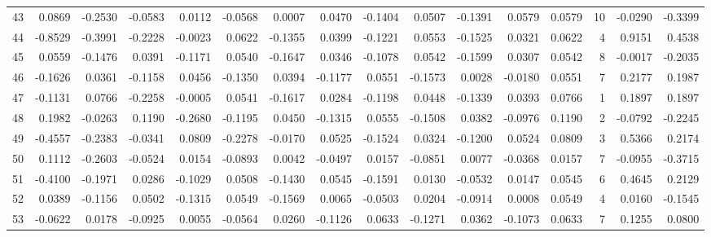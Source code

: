 \begin{tabular}{lrrrrrrrrrrrrrrr}
43  &      0.0869 & -0.2530 & -0.0583 &  0.0112 & -0.0568 &  0.0007 &  0.0470 & -0.1404 &  0.0507 & -0.1391 &   0.0579 &     0.0579 &     10 &                   -0.0290 &                    -0.3399 \\
44  &     -0.8529 & -0.3991 & -0.2228 & -0.0023 &  0.0622 & -0.1355 &  0.0399 & -0.1221 &  0.0553 & -0.1525 &   0.0321 &     0.0622 &      4 &                    0.9151 &                     0.4538 \\
45  &      0.0559 & -0.1476 &  0.0391 & -0.1171 &  0.0540 & -0.1647 &  0.0346 & -0.1078 &  0.0542 & -0.1599 &   0.0307 &     0.0542 &      8 &                   -0.0017 &                    -0.2035 \\
46  &     -0.1626 &  0.0361 & -0.1158 &  0.0456 & -0.1350 &  0.0394 & -0.1177 &  0.0551 & -0.1573 &  0.0028 &  -0.0180 &     0.0551 &      7 &                    0.2177 &                     0.1987 \\
47  &     -0.1131 &  0.0766 & -0.2258 & -0.0005 &  0.0541 & -0.1617 &  0.0284 & -0.1198 &  0.0448 & -0.1339 &   0.0393 &     0.0766 &      1 &                    0.1897 &                     0.1897 \\
48  &      0.1982 & -0.0263 &  0.1190 & -0.2680 & -0.1195 &  0.0450 & -0.1315 &  0.0555 & -0.1508 &  0.0382 &  -0.0976 &     0.1190 &      2 &                   -0.0792 &                    -0.2245 \\
49  &     -0.4557 & -0.2383 & -0.0341 &  0.0809 & -0.2278 & -0.0170 &  0.0525 & -0.1524 &  0.0324 & -0.1200 &   0.0524 &     0.0809 &      3 &                    0.5366 &                     0.2174 \\
50  &      0.1112 & -0.2603 & -0.0524 &  0.0154 & -0.0893 &  0.0042 & -0.0497 &  0.0157 & -0.0851 &  0.0077 &  -0.0368 &     0.0157 &      7 &                   -0.0955 &                    -0.3715 \\
51  &     -0.4100 & -0.1971 &  0.0286 & -0.1029 &  0.0508 & -0.1430 &  0.0545 & -0.1591 &  0.0130 & -0.0532 &   0.0147 &     0.0545 &      6 &                    0.4645 &                     0.2129 \\
52  &      0.0389 & -0.1156 &  0.0502 & -0.1315 &  0.0549 & -0.1569 &  0.0065 & -0.0503 &  0.0204 & -0.0914 &   0.0008 &     0.0549 &      4 &                    0.0160 &                    -0.1545 \\
53  &     -0.0622 &  0.0178 & -0.0925 &  0.0055 & -0.0564 &  0.0260 & -0.1126 &  0.0633 & -0.1271 &  0.0362 &  -0.1073 &     0.0633 &      7 &                    0.1255 &                     0.0800 \\

\end{tabular}
